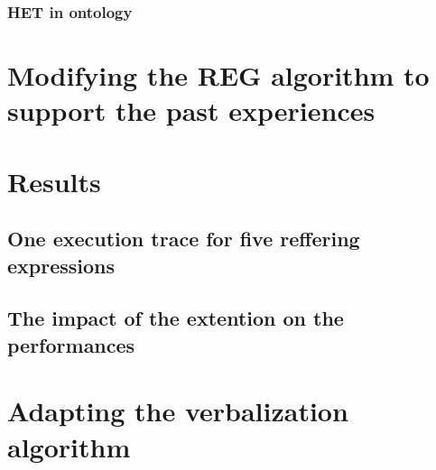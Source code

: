 \subsubsection{HET in ontology}

\section{Modifying the REG algorithm to support the past experiences}

\section{Results}

\subsection{One execution trace for five reffering expressions}

\subsection{The impact of the extention on the performances}

\section{Adapting the verbalization algorithm}